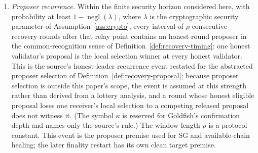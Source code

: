 \begin{assumption}
\begin{enumerate}
\item \emph{Proposer recurrence.}
Within the finite security horizon considered here, with probability at
least \(1-\operatorname{negl}(\lambda)\), where \(\lambda\) is the
cryptographic security parameter of Assumption~\ref{ass:crypto}, every
interval of \(\rho\)
consecutive recovery rounds after that relay point contains an honest round
proposer in the common-recognition sense of
Definition~\ref{def:recovery-timing}: one honest validator's proposal
is the local selection winner at every honest validator.  This is the
source's honest-leader recurrence event restated for the abstracted
proposer selection of Definition~\ref{def:recovery-proposal}; because
proposer selection is outside this paper's scope, the event is assumed
at this strength rather than derived from a lottery analysis, and a
round whose honest eligible proposal loses one receiver's local
selection to a competing released proposal does not witness it.  (The
symbol \(\kappa\) is reserved for Goldfish's confirmation depth and
names only the source's rule.)  The window length \(\rho\) is a protocol constant.  This event is the proposer premise
used for SG and available-chain healing; the later finality restart has its
own clean target premise.


\end{enumerate}
\end{assumption}
